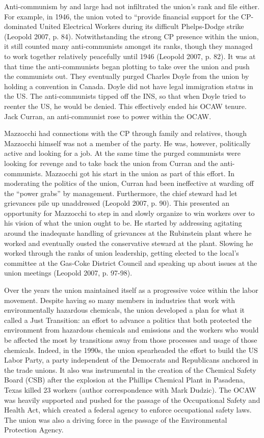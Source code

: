 Anti-communism by and large had not infiltrated the union’s rank and file either. For example, in 1946, the union voted to “provide financial support for the CP-dominated United Electrical Workers during its difficult Phelps-Dodge strike (Leopold 2007, p. 84). Notwithstanding the strong CP presence within the union, it still counted many anti-communists amongst its ranks, though they managed to work together relatively peacefully until 1946 (Leopold 2007, p. 82). It was at that time the anti-communists began plotting to take over the union and push the communists out. They eventually purged Charles Doyle from the union by holding a convention in Canada. Doyle did not have legal immigration status in the US. The anti-communists tipped off the INS, so that when Doyle tried to reenter the US, he would be denied. This effectively ended his OCAW tenure. Jack Curran, an anti-communist rose to power within the OCAW.

Mazzocchi had connections with the CP through family and relatives, though Mazzocchi himself was not a member of the party. He was, however, politically active and looking for a job. At the same time the purged communists were looking for revenge and to take back the union from Curran and the anti-communists. Mazzocchi got his start in the union as part of this effort. In moderating the politics of the union, Curran had been ineffective at warding off the “power grabs” by management. Furthermore, the chief steward had let grievances pile up unaddressed (Leopold 2007, p. 90). This presented an opportunity for Mazzocchi to step in and slowly organize to win workers over to his vision of what the union ought to be. He started by addressing agitating around the inadequate handling of grievances at the Rubinstein plant where he worked and eventually ousted the conservative steward at the plant. Slowing he worked through the ranks of union leadership, getting elected to the local’s committee at the Gas-Coke District Council and speaking up about issues at the union meetings (Leopold 2007, p. 97-98). 

Over the years the union maintained itself as a progressive voice within the labor movement. Despite having so many members in industries that work with environmentally hazardous chemicals, the union developed a plan for what it called a Just Transition: an effort to advance a politics that both protected the environment from hazardous chemicals and emissions and the workers who would be affected the most by transitions away from those processes and usage of those chemicals. Indeed, in the 1990s, the union  spearheaded the effort to build the US Labor Party, a party independent of the Democrats and Republicans anchored in the trade unions. It also was instrumental in the creation of the Chemical Safety Board (CSB) after the explosion at the Phillips Chemical Plant in Pasadena, Texas killed 23 workers (author correspondence with Mark Dudzic). The OCAW was heavily supported and pushed for the passage of the Occupational Safety and Health Act, which created a federal agency to enforce occupational safety laws. The union was also a driving force in the passage of the Environmental Protection Agency.


